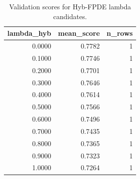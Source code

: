 \begin{table}[t]
\caption{Validation scores for Hyb-FPDE lambda candidates.}
\label{tab:lambda_distribution_computed}
\centering
\begin{tabular}{rrr}
\toprule
lambda\_hyb & mean\_score & n\_rows \\
\midrule
0.0000 & 0.7782 & 1 \\
0.1000 & 0.7746 & 1 \\
0.2000 & 0.7701 & 1 \\
0.3000 & 0.7646 & 1 \\
0.4000 & 0.7614 & 1 \\
0.5000 & 0.7566 & 1 \\
0.6000 & 0.7496 & 1 \\
0.7000 & 0.7435 & 1 \\
0.8000 & 0.7365 & 1 \\
0.9000 & 0.7323 & 1 \\
1.0000 & 0.7264 & 1 \\
\bottomrule
\end{tabular}

\end{table}

